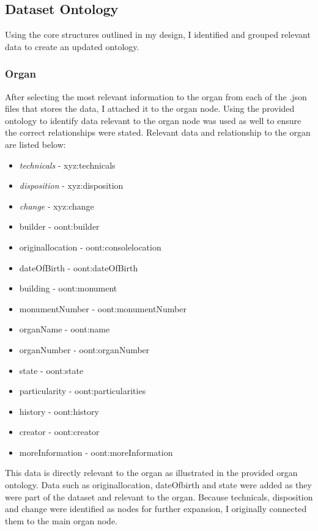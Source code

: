 \subsection{Dataset Ontology}
\hspace*{0.5cm} Using the core structures outlined in my design, I identified and grouped relevant data to create an updated ontology. 

\subsubsection{Organ}
\hspace*{0.5cm} After selecting the most relevant information to the organ from each of the .json files that stores the data, I attached it to the organ node. Using the provided ontology to identify data relevant to the organ node was used as well to ensure the correct relationships were stated. Relevant data and relationship to the organ are listed below:

\begin{itemize}
    \itemsep0em 
    \item \textit{technicals} - xyz:technicals
    \item \textit{disposition} - xyz:disposition
    \item \textit{change} - xyz:change
    \item builder - oont:builder
    \item originallocation - oont:consolelocation
    \item dateOfBirth - oont:dateOfBirth
    \item building - oont:monument
    \item monumentNumber - oont:monumentNumber
    \item organName - oont:name
    \item organNumber - oont:organNumber 
    \item state - oont:state 
    \item particularity - oont:particularities
    \item history - oont:history
    \item creator - oont:creator
    \item moreInformation - oont:moreInformation 
\end{itemize}

This data is directly relevant to the organ as illustrated in the provided organ ontology. Data such as originallocation, dateOfbirth and state were added as they were part of the dataset and relevant to the organ. Because technicals, disposition and change were identified as nodes for further expansion, I originally connected them to the main organ node. 

